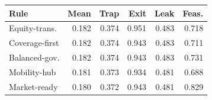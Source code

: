 \begin{tabular}{@{}lrrrrr@{}}
\toprule
Rule & Mean & Trap & Exit & Leak & Feas. \\
\midrule
Equity-trans. & 0.182 & 0.374 & 0.951 & 0.483 & 0.718 \\
Coverage-first & 0.182 & 0.374 & 0.943 & 0.483 & 0.711 \\
Balanced-gov. & 0.182 & 0.374 & 0.943 & 0.483 & 0.731 \\
Mobility-hub & 0.181 & 0.373 & 0.934 & 0.481 & 0.688 \\
Market-ready & 0.180 & 0.372 & 0.943 & 0.481 & 0.829 \\
\bottomrule
\end{tabular}
